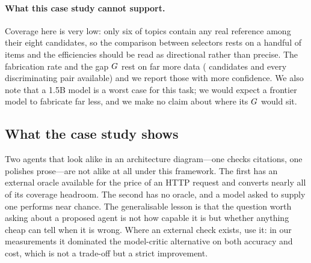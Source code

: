 \paragraph{What this case study cannot support.}
Coverage here is very low: only six of \nCitTopics{} topics contain any real
reference among their eight candidates, so the comparison between selectors
rests on a handful of items and the efficiencies should be read as directional
rather than precise. The fabrication rate and the gap $G$ rest on far more
data (\citParseable{} candidates and every discriminating pair available) and
we report those with more confidence. We also note that a 1.5B model is a
worst case for this task; we would expect a frontier model to fabricate far
less, and we make no claim about where its $G$ would sit.

\subsection{What the case study shows}

Two agents that look alike in an architecture diagram---one checks citations,
one polishes prose---are not alike at all under this framework. The first has an
external oracle available for the price of an HTTP request and converts nearly
all of its coverage headroom. The second has no oracle, and a model asked to
supply one performs near chance. The generalisable lesson is that the question
worth asking about a proposed agent is not how capable it is but whether
anything cheap can tell when it is wrong. Where an external check exists, use
it: in our measurements it dominated the model-critic alternative on both
accuracy and cost, which is not a trade-off but a strict improvement.
